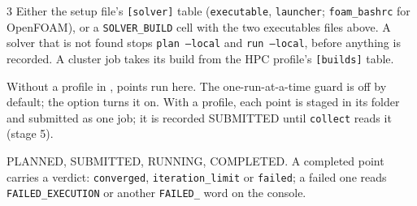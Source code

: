 \begin{multicols}{3}
Either the setup file's \texttt{[solver]} table (\texttt{executable}, \texttt{launcher}; \texttt{foam\_bashrc} for OpenFOAM), or a \texttt{SOLVER\_BUILD} cell with the two executables files above. A solver that is not found stops \texttt{plan --local} and \texttt{run --local}, before anything is recorded. A cluster job takes its build from the HPC profile's \texttt{[builds]} table.

\columnbreak
{}
Without a profile in , points run here. The one-run-at-a-time guard is off by default; the option turns it on. With a profile, each point is staged in its folder and submitted as one job; it is recorded SUBMITTED until \texttt{collect} reads it (stage 5).

PLANNED, SUBMITTED, RUNNING, COMPLETED. A completed point carries a verdict: \texttt{converged}, \texttt{iteration\_limit} or \texttt{failed}; a failed one reads \texttt{FAILED\_EXECUTION} or another \texttt{FAILED\_} word on the console.

\end{multicols}
\foot


